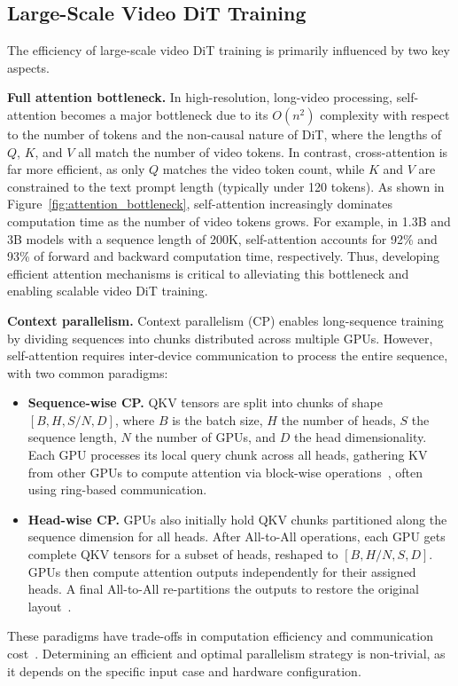 \subsection{Large-Scale Video DiT Training}
\label{sec:dit_training}
The efficiency of large-scale video DiT training is primarily influenced by two key aspects.

\noindent\textbf{Full attention bottleneck.}  In high-resolution, long-video processing, self-attention becomes a major bottleneck due to its $O(n^2)$ complexity with respect to the number of tokens and the non-causal nature of DiT, where the lengths of ${Q}$, ${K}$, and ${V}$ all match the number of video tokens.
In contrast, cross-attention is far more efficient, as only ${Q}$ matches the video token count, while ${K}$ and ${V}$ are constrained to the text prompt length (typically under 120 tokens). As shown in Figure~\ref{fig:attention_bottleneck}, self-attention increasingly dominates computation time as the number of video tokens grows. For example, in 1.3B and 3B models with a sequence length of 200K, self-attention accounts for 92\% and 93\% of forward and backward computation time, respectively.
Thus, developing efficient attention mechanisms is critical to alleviating this bottleneck and enabling scalable video DiT training.

\noindent\textbf{Context parallelism.} Context parallelism (CP) enables long-sequence training by dividing sequences into chunks distributed across multiple GPUs. However, self-attention requires inter-device communication to process the entire sequence, with two common paradigms:

\begin{itemize}[leftmargin=*]
    \item \textbf{Sequence-wise CP.} QKV tensors are split into chunks of shape $[B, H, S/N, D]$, where $B$ is the batch size, $H$ the number of heads, $S$ the sequence length, $N$ the number of GPUs, and $D$ the head dimensionality. Each GPU processes its local query chunk across all heads, gathering KV from other GPUs to compute attention via block-wise operations~\cite{liu2023ring}, often using ring-based communication.

    \item \textbf{Head-wise CP.} GPUs also initially hold QKV chunks partitioned along the sequence dimension for all heads. After All-to-All operations, each GPU gets complete QKV tensors for a subset of heads, reshaped to $[B, H/N, S, D]$. GPUs then compute attention outputs independently for their assigned heads. A final All-to-All re-partitions the outputs to restore the original layout~\cite{jacobs2023deepspeedulysses}. 

\end{itemize}

These paradigms have trade-offs in computation efficiency and communication cost~\cite{gu2024loongtrain,fang2024usp}. Determining an efficient and optimal parallelism strategy is non-trivial, as it depends on the specific input case and hardware configuration.


